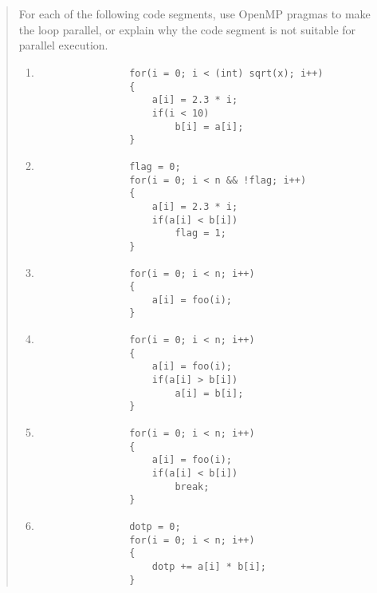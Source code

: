 \documentclass{article}
\begin{document}
\section{}
    \begin{quote}
        For each of the following code segments, use OpenMP pragmas to make the loop parallel, or explain why the code segment is not suitable for parallel execution.

        \begin{enumerate}
            \item \begin{verbatim}
                for(i = 0; i < (int) sqrt(x); i++)
                {
                    a[i] = 2.3 * i;
                    if(i < 10)
                        b[i] = a[i];
                }
            \end{verbatim}

            \item \begin{verbatim}
                flag = 0;
                for(i = 0; i < n && !flag; i++)
                {
                    a[i] = 2.3 * i;
                    if(a[i] < b[i])
                        flag = 1;
                }
            \end{verbatim}

            \item \begin{verbatim}
                for(i = 0; i < n; i++)
                {
                    a[i] = foo(i);
                }
            \end{verbatim}

            \item \begin{verbatim}
                for(i = 0; i < n; i++)
                {
                    a[i] = foo(i);
                    if(a[i] > b[i])
                        a[i] = b[i];
                }
            \end{verbatim}

            \item \begin{verbatim}
                for(i = 0; i < n; i++)
                {
                    a[i] = foo(i);
                    if(a[i] < b[i])
                        break;
                }
            \end{verbatim}

            \item \begin{verbatim}
                dotp = 0;
                for(i = 0; i < n; i++)
                {
                    dotp += a[i] * b[i];
                }
            \end{verbatim}


\end{enumerate}
\end{quote}
\end{document}
